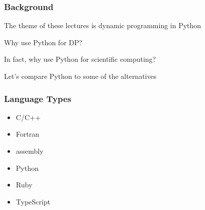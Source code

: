 \begin{frame}
    \frametitle{Background}

    The theme of these lectures is dynamic programming in Python


        \vspace{0.3em}
        \vspace{0.3em}
        \vspace{0.3em}
        \vspace{0.3em}
    Why use Python for DP?

        \vspace{0.3em}
        \vspace{0.3em}
        \vspace{0.3em}
        \vspace{0.3em}
    In fact, why use Python for scientific computing?

        \vspace{0.3em}
        \vspace{0.3em}
        \vspace{0.3em}
        \vspace{0.3em}
    Let's compare Python to some of the alternatives

\end{frame}





\begin{frame}
    \frametitle{Language Types}
    
    
    \begin{itemize}
        \item C/C++
        \item Fortran
        \item assembly
    \end{itemize}

    \vspace{1em}


    \begin{itemize}
        \item Python
        \item Ruby
        \item TypeScript
    \end{itemize}

\end{frame}




